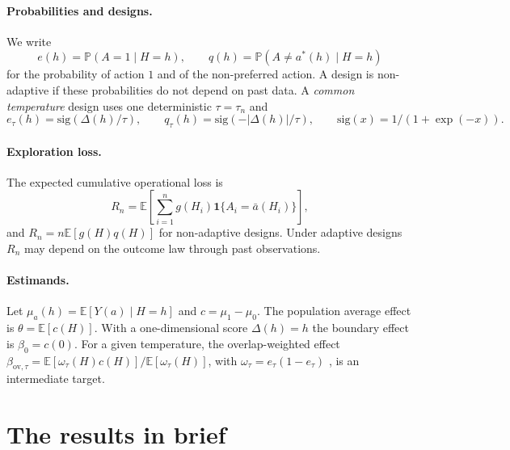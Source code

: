 \documentclass[12pt]{article}
\theoremstyle{definition}
\theoremstyle{remark}
\newcommand{\E}{\mathbb{E}}
\newcommand{\Prob}{\mathbb{P}}
\newcommand{\ov}{\mathrm{ov}}
\newcommand{\sgm}{\mathrm{sig}}
\begin{document}
\paragraph{Probabilities and designs.} We write
\[
e(h)=\Prob(A=1\mid H=h),\qquad q(h)=\Prob(A\neq a^*(h)\mid H=h)
\]
for the probability of action $1$ and of the non-preferred action. A design is
non-adaptive if these probabilities do not depend on past data. A \emph{common
temperature} design uses one deterministic $\tau=\tau_n$ and
\[
e_\tau(h)=\sgm(\Delta(h)/\tau),\qquad q_\tau(h)=\sgm(-|\Delta(h)|/\tau),
\qquad \sgm(x)=1/(1+\exp(-x)).
\]

\paragraph{Exploration loss.} The expected cumulative operational loss is
\begin{equation}\label{eq:loss-definition}
 R_n=\E\left[\sum_{i=1}^n g(H_i)\mathbf 1\{A_i=\bar a(H_i)\}\right],
\end{equation}
and $R_n=n\E[g(H)q(H)]$ for non-adaptive designs. Under adaptive designs $R_n$
may depend on the outcome law through past observations.

\paragraph{Estimands.} Let $\mu_a(h)=\E[Y(a)\mid H=h]$ and $c=\mu_1-\mu_0$. The
population average effect is $\theta=\E[c(H)]$. With a one-dimensional score
$\Delta(h)=h$ the boundary effect is $\beta_0=c(0)$. For a given temperature, the
overlap-weighted effect
$\beta_{\ov,\tau}=\E[\omega_\tau(H)c(H)]/\E[\omega_\tau(H)]$, with
$\omega_\tau=e_\tau(1-e_\tau)$ \cite{li2018balancing}, is an intermediate target.

\section{The results in brief}\label{sec:brief}
\end{document}
